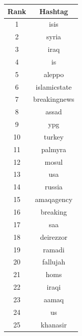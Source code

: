 \documentclass[conference]{IEEEtran}
\begin{document}
    \begin{table}[ht]
        \begin{tabular} { | c | c | }
            \hline
            Rank & Hashtag        \\
            \hline
            1    & isis           \\
            \hline
            2    & syria          \\
            \hline
            3    & iraq           \\
            \hline
            4    & is             \\
            \hline
            5    & aleppo         \\
            \hline
            6    & islamicstate   \\
            \hline
            7    & breakingnews   \\
            \hline
            8    & assad          \\
            \hline
            9    & ypg            \\
            \hline
            10   & turkey         \\
            \hline
            11   & palmyra        \\
            \hline
            12   & mosul          \\
            \hline
            13   & usa            \\
            \hline
            14   & russia         \\
            \hline
            15   & amaqagency     \\
            \hline
            16   & breaking       \\
            \hline
            17   & saa            \\
            \hline
            18   & deirezzor      \\
            \hline
            19   & ramadi         \\
            \hline
            20   & fallujah       \\
            \hline
            21   & homs           \\
            \hline
            22   & iraqi          \\
            \hline
            23   & aamaq          \\
            \hline
            24   & us             \\
            \hline
            25   & khanasir       \\

\end{tabular}
\end{table}
\end{document}

